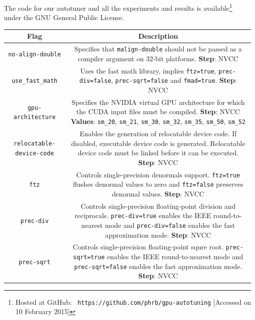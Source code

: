 The code for our autotuner and all the experiments and results is
available\footnote{Hosted at GitHub: \texttt{\scriptsize
https://github.com/phrb/gpu-autotuning} [Accessed on 10 February 2015]} under
the GNU General Public License.

\newcommand{\specialcell}[1]{\begin{minipage}[m]{0.52\columnwidth}\centering#1\end{minipage}}

\begin{table}[htpb]
    \centering
    \footnotesize
        \begin{tabular}{cc}
        \toprule
        \textbf{Flag}&\textbf{Description} \\\midrule
        \texttt{no-align-double} & \specialcell{Specifies that \texttt{malign-double} should not be passed as a compiler argument on 32-bit platforms. \textbf{Step}: NVCC} \\ \midrule
        \texttt{use\_fast\_math} & \specialcell{Uses the fast math library, implies \texttt{ftz=true}, \texttt{prec-div=false}, \texttt{prec-sqrt=false} and \texttt{fmad=true}. \textbf{Step}: NVCC} \\\midrule
        \texttt{gpu-architecture} & \specialcell{Specifies the NVIDIA virtual GPU architecture for which the CUDA input files must be compiled. \textbf{Step}: NVCC \textbf{Values}: \texttt{sm\_20}, \texttt{sm\_21}, \texttt{sm\_30}, \texttt{sm\_32}, \texttt{sm\_35}, \texttt{sm\_50}, \texttt{sm\_52}} \\\midrule
        \texttt{relocatable-device-code} & \specialcell{Enables the generation of relocatable device code. If disabled, executable device code is generated. Relocatable device code must be linked before it can be executed. \textbf{Step}: NVCC} \\\midrule
        \texttt{ftz} & \specialcell{Controls single-precision denormals support. \texttt{ftz=true} flushes denormal values to zero and \texttt{ftz=false} preserves denormal values. \textbf{Step}: NVCC} \\\midrule
        \texttt{prec-div} & \specialcell{Controls single-precision floating-point division and reciprocals. \texttt{prec-div=true} enables the IEEE round-to-nearest mode and \texttt{prec-div=false} enables the fast approximation mode. \textbf{Step}: NVCC} \\\midrule
        \texttt{prec-sqrt} & \specialcell{Controls single-precision floating-point squre root. \texttt{prec-sqrt=true} enables the IEEE round-to-nearest mode and \texttt{prec-sqrt=false} enables the fast approximation mode. \textbf{Step}: NVCC} \\\midrule

\end{tabular}
\end{table}
